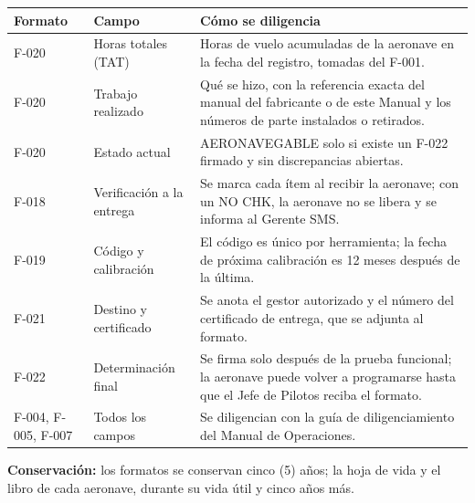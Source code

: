 \begin{longtable}{|p{1.7cm}|p{4.3cm}|p{8.5cm}|}
\hline
\rowcolor[gray]{0.9}\textbf{Formato} & \textbf{Campo} & \textbf{Cómo se diligencia} \\ \hline
\endhead
F-020 & Horas totales (TAT) & Horas de vuelo acumuladas de la aeronave en la fecha del registro, tomadas del F-001. \\ \hline
F-020 & Trabajo realizado & Qué se hizo, con la referencia exacta del manual del fabricante o de este Manual y los números de parte instalados o retirados. \\ \hline
F-020 & Estado actual & AERONAVEGABLE solo si existe un F-022 firmado y sin discrepancias abiertas. \\ \hline
F-018 & Verificación a la entrega & Se marca cada ítem al recibir la aeronave; con un NO CHK, la aeronave no se libera y se informa al Gerente SMS. \\ \hline
F-019 & Código y calibración & El código es único por herramienta; la fecha de próxima calibración es 12 meses después de la última. \\ \hline
F-021 & Destino y certificado & Se anota el gestor autorizado y el número del certificado de entrega, que se adjunta al formato. \\ \hline
F-022 & Determinación final & Se firma solo después de la prueba funcional; la aeronave puede volver a programarse hasta que el Jefe de Pilotos reciba el formato. \\ \hline
F-004, F-005, F-007 & Todos los campos & Se diligencian con la guía de diligenciamiento del Manual de Operaciones. \\ \hline
\end{longtable}
\textbf{Conservación:} los formatos se conservan cinco (5) años; la hoja de vida y el libro de cada aeronave, durante su vida útil y cinco años más.
